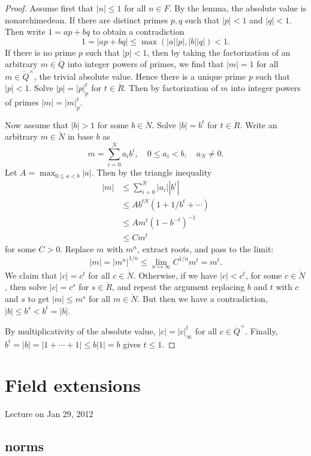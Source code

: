 \documentclass{amsart}
\def\abs#1{{|#1|}}
\def\RR{\ring{R}}
\begin{document}
\begin{proof}
Assume first that $\abs{n}\le 1$ for all $n\in F$.  By the lemma, the
absolute value is nonarchimedean.  If there are  distinct primes $p,q$
such that $\abs{p}<1$ and $\abs{q}<1$. Then write $1 = a p + b q$ to obtain
a contradiction
\[
1 = \abs{a p + b q} \le \max(\abs{a}\abs{p},\abs{b}\abs{q}) < 1.
\]
If there is no prime $p$ such that $\abs{p}<1$, then by taking the
factorization of an arbitrary $m\in\ring{Q}$ into integer powers of
primes, we find that $\abs{m}=1$ for all $m\in\ring{Q}^\times$, the
trivial absolute value.  Hence there is a unique prime $p$ such that
$\abs{p}<1$.  Solve $\abs{p}=\abs{p}_p^t$ for $t\in\RR$.  Then by
factorization of $m$ into integer powers of primes
$\abs{m}=\abs{m}_p^t$.

Now assume that $\abs{b}>1$ for some $b\in\ring{N}$.  Solve $\abs{b}=b^t$
for $t\in\RR$.  Write an arbitrary
$m\in\ring{N}$ in base $b$ as
\[
m = \sum_{i=0}^N a_i b^i,\quad 0\le a_i < b,\quad a_N\ne 0.
\] 
Let $A = \max_{0\le a < b} \abs{a}$.
Then by the triangle inequality
\begin{align*}
\abs{m} &\le \sum_{i=0}^N \abs{a_i} \abs{b^i} \\
  &\le A b^{t N} (1+1/b^t+\cdots)\\
  &\le A m^t (1-b^{-t})^{-1}\\
  &\le C m^t
\end{align*}
for some $C>0$.
Replace $m$ with $m^n$,  extract roots, and pass to the limit:
\[
\abs{m}=\abs{m^n}^{1/n}\le \lim_{n\mapsto\infty} C^{1/n} m^t = m^t.
\]
We claim that $\abs{c}=c^t$ for all $c\in\ring{N}$.
Otherwise, if we have $\abs{c} < c^t$, for some $c\in\ring{N}$, then solve $\abs{c}=c^s$
for $s\in\RR$, and repeat the argument replacing $b$ and $t$ with $c$ and $s$
to get $\abs{m} \le m^s$ for all $m\in\ring{N}$.  But then we have a contradiction,
$\abs{b}\le b^s < b^t=\abs{b}$. 

By multiplicativity of the absolute value, $\abs{c}=\abs{c}_\infty^t$ for all
$c\in\ring{Q}^\times$.
Finally, $b^t=\abs{b}=\abs{1+\cdots+1} \le b\abs{1} = b$ gives $t\le 1$.
\end{proof}

\newpage
\section{Field extensions}

Lecture on Jan 29, 2012

\subsection{norms}
\end{document}
